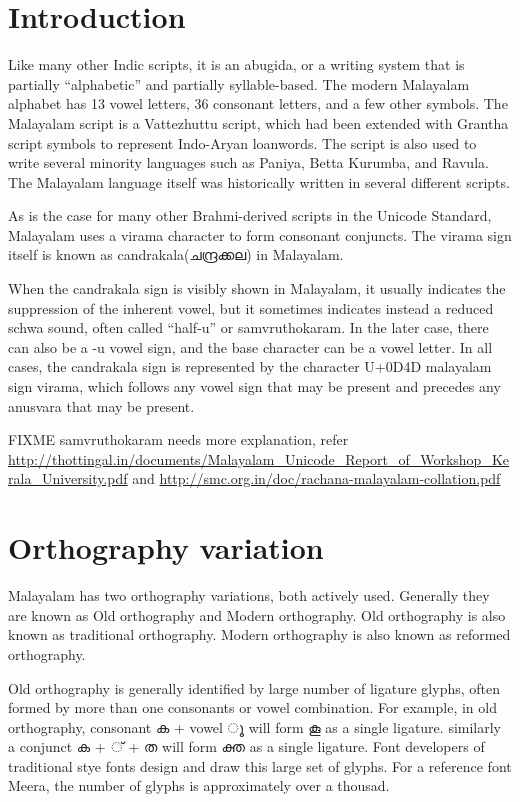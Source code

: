 \section{Introduction}

Like many other Indic scripts, it is an abugida, or a writing system that is partially “alphabetic” and partially syllable-based. The modern Malayalam alphabet has 13 vowel letters, 36 consonant letters, and a few other symbols. The Malayalam script is a Vattezhuttu script, which had been extended with Grantha script symbols to represent Indo-Aryan loanwords. The script is also used to write several minority languages such as Paniya, Betta Kurumba, and Ravula. The Malayalam language itself was historically written in several different scripts.

As is the case for many other Brahmi-derived scripts in the Unicode Standard, Malayalam uses a virama character to form consonant conjuncts. The virama sign itself is known as candrakala(ചന്ദ്രക്കല) in Malayalam. 

When the candrakala sign is visibly shown in Malayalam, it usually indicates the suppression of the inherent vowel, but it sometimes indicates instead a reduced schwa sound, often called “half-u” or samvruthokaram. In the later case, there can also be a -u vowel sign, and the base character can be a vowel letter. In all cases, the candrakala sign is represented by the character U+0D4D malayalam sign virama, which follows any vowel sign that may be present and precedes any anusvara that may be present. 

FIXME samvruthokaram needs more explanation, refer {\url{http://thottingal.in/documents/Malayalam_Unicode_Report_of_Workshop_Kerala_University.pdf}} and {\url{http://smc.org.in/doc/rachana-malayalam-collation.pdf}}

\section{Orthography variation}

Malayalam has two orthography variations, both actively used. Generally they are known as Old orthography and Modern orthography. Old orthography is also known as traditional orthography. Modern orthography is also known as reformed orthography.

Old orthography is generally identified by large number of ligature glyphs, often formed by more than one consonants or vowel combination. For example, in old orthography, consonant {\meera ക} + vowel { \meera ൂ}  will  form കൂ as a single ligature. similarly a conjunct {\meera ക + ് + ത} will form {\meera ക്ത} as a single ligature. Font developers of traditional stye fonts design and draw this large set of glyphs. For a reference font Meera, the number of glyphs is approximately over a thousad.


